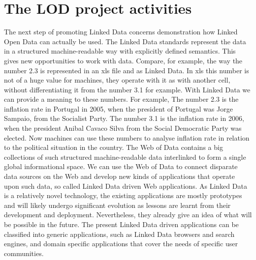 \documentclass[a4paper,12pt,oneside]{report}
\begin{document}
{{{\section{The LOD project activities}
{The next step of promoting Linked Data concerns demonstration how Linked Open
Data can actually be used. The Linked Data standards represent the data in a structured machine-readable way with explicitly defined semantics. This gives new opportunities to work with data. Compare, for example, the way the number 2.3 is represented in an xls file and as Linked Data. In xls this number is not of a huge value for machines, they operate with it as with another cell, without differentiating it from the number 3.1 for example. With Linked Data we can provide a meaning to these numbers. For example, The number 2.3 is the inflation rate in Portugal in 2005, when the president of Portugal was Jorge Sampaio, from the Socialist Party. The number 3.1 is the inflation rate in 2006, when the president Anibal Cavaco Silva from the Social Democratic Party was elected. Now machines can use these numbers to analyse inflation rate in relation to the political situation in the country. The Web of Data contains a big collections of such structured machine-readable data interlinked to form a single global informational space. We can use the Web of Data to connect disparate data sources on the Web and develop new kinds of applications that operate upon such data, so called Linked Data driven Web applications. As Linked Data is a relatively novel technology, the existing applications are mostly prototypes and will likely undergo significant evolution as lessons are learnt from their development and deployment. Nevertheless, they already give an idea of what will be possible in the future. The present Linked Data driven applications can be classified into generic applications, such as Linked Data browsers and search engines, and domain specific applications that cover the needs of specific user communities.}
}}}
\end{document}

